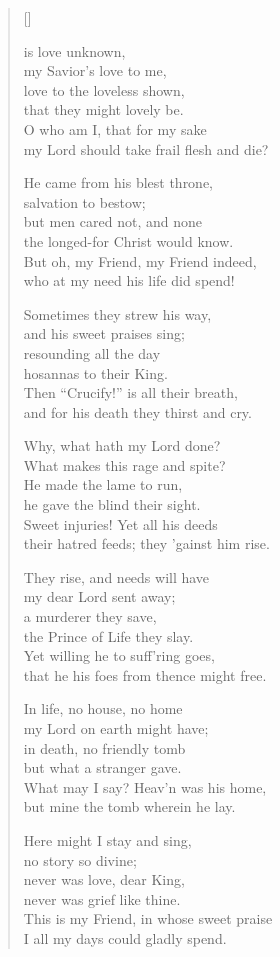 \newHymn
{}

\begin{verse}[\versewidth]

 is love unknown,\\
my Savior’s love to me,\\
love to the loveless shown,\\
that they might lovely be.\\
O who am I, that for my sake\\
my Lord should take frail flesh and die?

He came from his blest throne,\\
salvation to bestow;\\
but men cared not, and none\\
the longed-for Christ would know.\\
But oh, my Friend, my Friend indeed,\\
who at my need his life did spend!

Sometimes they strew his way,\\
and his sweet praises sing;\\
resounding all the day\\
hosannas to their King.\\
Then ``Crucify!'' is all their breath,\\
and for his death they thirst and cry.

Why, what hath my Lord done?\\
What makes this rage and spite?\\
He made the lame to run,\\
he gave the blind their sight.\\
Sweet injuries! Yet all his deeds\\
their hatred feeds; they 'gainst him rise.

They rise, and needs will have\\
my dear Lord sent away;\\
a murderer they save,\\
the Prince of Life they slay.\\
Yet willing he to suff'ring goes,\\
that he his foes from thence might free.

In life, no house, no home\\
my Lord on earth might have;\\
in death, no friendly tomb\\
but what a stranger gave.\\
What may I say? Heav'n was his home,\\
but mine the tomb wherein he lay.

Here might I stay and sing,\\
no story so divine;\\
never was love, dear King,\\
never was grief like thine.\\
This is my Friend, in whose sweet praise\\
I all my days could gladly spend.

\end{verse}


